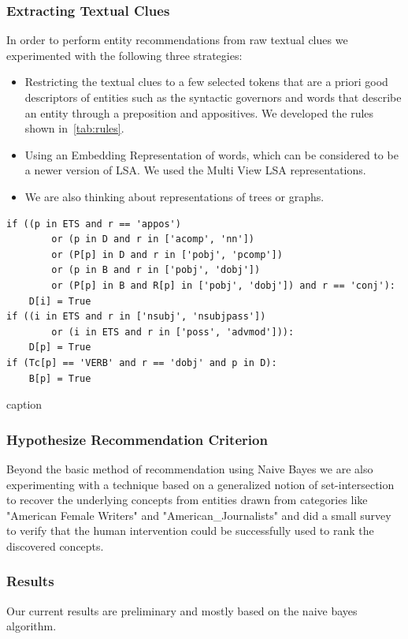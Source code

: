 \documentclass{article}
\begin{document}
\subsubsection{Extracting Textual Clues}
\label{sssec:etc}
In order to perform entity recommendations from raw textual clues we
experimented with the following three strategies:
\begin{itemize}
\item Restricting the textual clues to a few selected tokens that are
a priori good descriptors of entities such as the syntactic governors and words
that describe an entity through a preposition and appositives. We developed the rules shown
in~\ref{tab:rules}.
\item Using an Embedding Representation of words, which can be considered to be a newer version of LSA.
We used the Multi View LSA representations.
\item We are also thinking about representations of trees or graphs.
\end{itemize}

\begin{table}[htbp]
  \centering
  \begin{verbatim}
if ((p in ETS and r == 'appos')
        or (p in D and r in ['acomp', 'nn'])
        or (P[p] in D and r in ['pobj', 'pcomp'])
        or (p in B and r in ['pobj', 'dobj'])
        or (P[p] in B and R[p] in ['pobj', 'dobj']) and r == 'conj'):
    D[i] = True
if ((i in ETS and r in ['nsubj', 'nsubjpass'])
        or (i in ETS and r in ['poss', 'advmod'])):
    D[p] = True
if (Tc[p] == 'VERB' and r == 'dobj' and p in D):
    B[p] = True
\end{verbatim}
  \caption{caption}
  \label{tab:rules}
\end{table}

\subsubsection{{Hypothesize Recommendation Criterion}}
\label{sssec:hyp}
Beyond the basic method of recommendation using Naive Bayes we are also experimenting
with a technique based on a
generalized notion of set-intersection to recover the underlying concepts from
entities drawn from categories like "American Female Writers" and
"American\_Journalists" and did a small survey to verify that the human
intervention could be successfully used to rank the discovered concepts.


\subsubsection{Results}
\label{sssec:results}
Our current results are preliminary and mostly based on the naive bayes algorithm.
\end{document}
